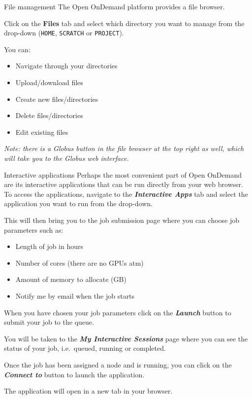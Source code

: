 \documentclass[
  10pt,
  ignorenonframetext,
  aspectratio=169]{beamer}
\providecommand{\tightlist}{%
  \setlength{\itemsep}{0pt}\setlength{\parskip}{0pt}}
\begin{document}
\begin{frame}[fragile]{File management}
\label{file-management}
The Open OnDemand platform provides a file browser.

Click on the \textbf{Files} tab and select which directory you want to manage from the drop-down (\texttt{HOME}, \texttt{SCRATCH} or \texttt{PROJECT}).

\pause

You can:

\begin{itemize}
\tightlist
\item
  Navigate through your directories
\item
  Upload/download files
\item
  Create new files/directories
\item
  Delete files/directories
\item
  Edit existing files
\end{itemize}

\pause

\emph{Note: there is a Globus button in the file browser at the top right as well, which will take you to the Globus web interface.}
\end{frame}

\begin{frame}{Interactive applications}
\label{interactive-applications}
Perhaps the most convenient part of Open OnDemand are its interactive applications that can be run directly from your web browser. To access the applications, navigate to the \textbf{\emph{Interactive Apps}} tab and select the application you want to run from the drop-down.

\pause

This will then bring you to the job submission page where you can choose job parameters such as:

\pause

\begin{itemize}
\tightlist
\item
  Length of job in hours
\item
  Number of cores (there are no GPUs atm)
\item
  Amount of memory to allocate (GB)
\item
  Notify me by email when the job starts
\end{itemize}

\pause

When you have chosen your job parameters click on the \textbf{\emph{Launch}} button to submit your job to the queue.

\pause

You will be taken to the \textbf{\emph{My Interactive Sessions}} page where you can see the status of your job, i.e.~queued, running or completed.

\pause

Once the job has been assigned a node and is running, you can click on the \textbf{\emph{Connect to }} button to launch the application.

\pause

The application will open in a new tab in your browser.
\end{frame}
\end{document}
